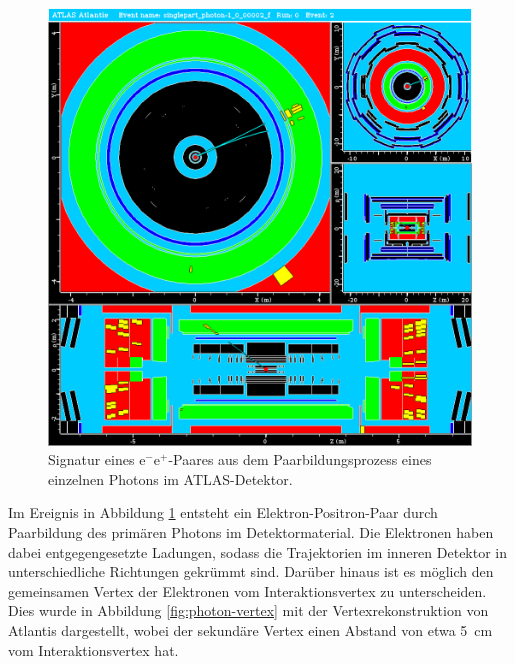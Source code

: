 \documentclass[11pt, a4paper]{article}
\numberwithin{equation}{section}
\begin{document}
\clearpage
\begin{figure}[htbp]
	\centering
	\includegraphics[width=1.0\textwidth]{./data/atlantis/singlepart_events_new/photons/conversion.png}
	\caption{Signatur eines $\mathrm{e}^- \mathrm{e}^+$-Paares aus dem Paarbildungsprozess eines einzelnen Photons im ATLAS-Detektor.}
	\label{fig:photon-conversion}
\end{figure}
\vfill
\noindent
Im Ereignis in Abbildung \ref{fig:photon-conversion} entsteht ein Elektron-Positron-Paar durch Paarbildung des primären Photons im Detektormaterial.
Die Elektronen haben dabei entgegengesetzte Ladungen, sodass die Trajektorien im inneren Detektor in unterschiedliche Richtungen gekrümmt sind.
Darüber hinaus ist es möglich den gemeinsamen Vertex der Elektronen vom Interaktionsvertex zu unterscheiden.
Dies wurde in Abbildung \ref{fig:photon-vertex} mit der Vertexrekonstruktion von Atlantis dargestellt, wobei der sekundäre Vertex einen Abstand von etwa \SI{5}{\centi\meter} vom Interaktionsvertex hat.
\vfill
\end{document}
